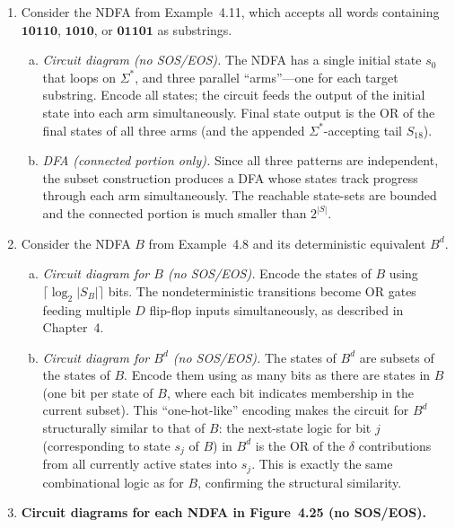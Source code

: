\begin{enumerate}[{4.}1.]
\item Consider the NDFA from Example~4.11, which accepts all words containing
$\pmb{10110}$, $\pmb{1010}$, or $\pmb{01101}$ as substrings.

\begin{enumerate}[(a)]
  \item \emph{Circuit diagram (no SOS/EOS).}  The NDFA has a single initial
  state $s_0$ that loops on $\Sigma^*$, and three parallel ``arms''---one for
  each target substring.  Encode all states; the circuit feeds the output of the
  initial state into each arm simultaneously.  Final state output is the OR of
  the final states of all three arms (and the appended $\Sigma^*$-accepting tail
  $S_{18}$).

  \item \emph{DFA (connected portion only).}  Since all three patterns are
  independent, the subset construction produces a DFA whose states track
  progress through each arm simultaneously.  The reachable state-sets are
  bounded and the connected portion is much smaller than $2^{|S|}$.
\end{enumerate}

\item Consider the NDFA $B$ from Example~4.8 and its deterministic equivalent $B^d$.

\begin{enumerate}[(a)]
  \item \emph{Circuit diagram for $B$ (no SOS/EOS).}  Encode the states of $B$
  using $\lceil\log_2|S_B|\rceil$ bits.  The nondeterministic transitions become
  OR gates feeding multiple $D$ flip-flop inputs simultaneously, as described in
  Chapter~4.

  \item \emph{Circuit diagram for $B^d$ (no SOS/EOS).}  The states of $B^d$ are
  subsets of the states of $B$.  Encode them using as many bits as there are
  states in $B$ (one bit per state of $B$, where each bit indicates membership
  in the current subset).  This ``one-hot-like'' encoding makes the circuit for
  $B^d$ structurally similar to that of $B$: the next-state logic for bit $j$
  (corresponding to state $s_j$ of $B$) in $B^d$ is the OR of the $\delta$
  contributions from all currently active states into $s_j$.  This is exactly
  the same combinational logic as for $B$, confirming the structural similarity.
\end{enumerate}

\item \textbf{Circuit diagrams for each NDFA in Figure~4.25 (no SOS/EOS).}


\end{enumerate}
